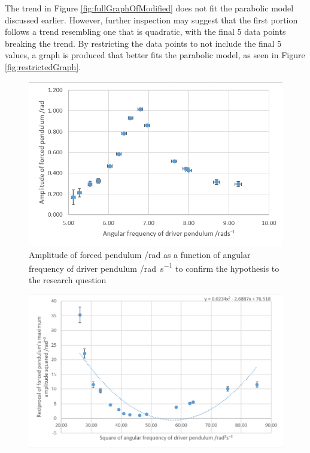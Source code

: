 \documentclass[letterpaper, 12pt]{article}
\begin{document}
The trend in Figure \ref*{fig:fullGraphOfModified} does not fit the parabolic model discussed
earlier. However, further inspection may suggest that
the first portion follows a trend resembling one
that is quadratic, with the final 5 data points
breaking the trend. By restricting the data points
to not include the final 5 values, a
graph is produced that better fits the parabolic model,
as seen in Figure \ref*{fig:restrictedGraph}.

\begin{paracol}{3}
    \begin{figure}[H]
        \centering
        \includegraphics[width=\linewidth]{defaultGraph.png}
        \caption{Amplitude of forced pendulum /\unit{rad} as a function of angular frequency of driver pendulum /\unit{rad.s^{-1}} to confirm the hypothesis to the research question}
        \label{fig:defaultGraph}
    \end{figure}
    \switchcolumn
    \begin{figure}[H]
        \centering
        \includegraphics[width=\linewidth]{fullGraphOfModified.png}

\end{figure}
\end{paracol}
\end{document}
